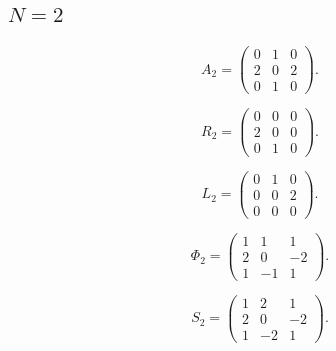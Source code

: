 \subsection{$N=2$}
\label{tab:matrices-N02}
\begingroup
\small
\setlength{\arraycolsep}{3pt}
\[
A_{2}=\begin{pmatrix}
0 & 1 & 0 \\
2 & 0 & 2 \\
0 & 1 & 0
\end{pmatrix}.
\]
\endgroup

\begingroup
\small
\setlength{\arraycolsep}{3pt}
\[
R_{2}=\begin{pmatrix}
0 & 0 & 0 \\
2 & 0 & 0 \\
0 & 1 & 0
\end{pmatrix}.
\]
\endgroup

\begingroup
\small
\setlength{\arraycolsep}{3pt}
\[
L_{2}=\begin{pmatrix}
0 & 1 & 0 \\
0 & 0 & 2 \\
0 & 0 & 0
\end{pmatrix}.
\]
\endgroup

\begingroup
\small
\setlength{\arraycolsep}{3pt}
\[
\Phi_{2}=\begin{pmatrix}
1 & 1 & 1 \\
2 & 0 & -2 \\
1 & -1 & 1
\end{pmatrix}.
\]
\endgroup

\begingroup
\small
\setlength{\arraycolsep}{3pt}
\[
S_{2}=\begin{pmatrix}
1 & 2 & 1 \\
2 & 0 & -2 \\
1 & -2 & 1
\end{pmatrix}.
\]
\endgroup

